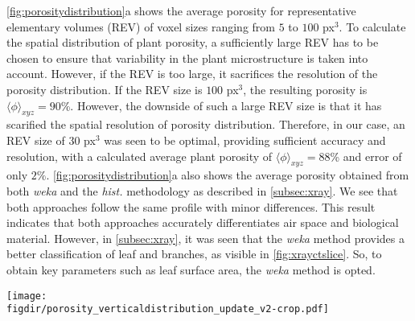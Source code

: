 \cref{fig:porositydistribution}a shows the average porosity for representative elementary volumes (REV) of voxel sizes ranging from $5$ to $100$ px$^3$. To calculate the spatial distribution of plant porosity, a sufficiently large REV has to be chosen to ensure that variability in the plant microstructure is taken into account. However, if the REV is too large, it sacrifices the resolution of the porosity distribution. If the REV size is $100$ px$^3$, the resulting porosity is $\langle \phi \rangle_{\textit{xyz}}  = 90$\%. However, the downside of such a large REV size is that it has scarified the spatial resolution of porosity distribution. Therefore, in our case, an REV size of $30$ px$^3$ was seen to be optimal, providing sufficient accuracy and resolution, with a calculated average plant porosity of $\langle \phi \rangle_{\textit{xyz}} = 88$\% and error of only $2\%$. \cref{fig:porositydistribution}a also shows the average porosity obtained from both \textit{weka} and the \textit{hist.} methodology as described in \cref{subsec:xray}. We see that both approaches follow the same profile with minor differences. This result indicates that both approaches accurately differentiates air space and biological material. However, in \cref{subsec:xray}, it was seen that the \textit{weka} method provides a better classification of leaf and branches, as visible in \cref{fig:xrayctslice}. So, to obtain key parameters such as leaf surface area, the \textit{weka} method is opted.

\begin{sidewaysfigure}[p]
		\centering
		\texttt{[image: \\figdir/porosity\_verticaldistribution\_update\_v2-crop.pdf]}
		\caption{ Average plant porosity$\langle \phi \rangle_{xyz}$ with respect to voxel size (px$^3$) as a base for determining the REV for calculating porosity distribution,  Three vertical porosity distributions: optical $\beta$, aerodynamic $\alpha$ and true porosity $\langle \phi \rangle_{xy}$, and  leaf area density $\langle a \rangle_{xy}$ (m$^2$ m$^{-3}$) (blue) and normalized short-wave radiative flux $q_{\textit{r,sw}}$ profile (red) inside vegetation determined using Beer-Lambert law extinction coefficient of short-wave radiation $\mu_{\textit{sw}}=0.78$ \citep{Manickathan2018a}.}
		\label{fig:porositydistribution}
\end{sidewaysfigure}

